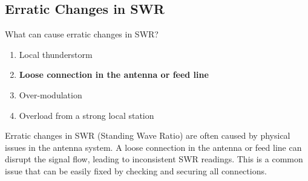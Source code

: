 \subsection{Erratic Changes in SWR}
\label{T9B09}

\begin{tcolorbox}[colback=gray!10!white,colframe=black!75!black,title=T9B09]
What can cause erratic changes in SWR?
\begin{enumerate}[noitemsep]
    \item Local thunderstorm
    \item \textbf{Loose connection in the antenna or feed line}
    \item Over-modulation
    \item Overload from a strong local station
\end{enumerate}
\end{tcolorbox}

Erratic changes in SWR (Standing Wave Ratio) are often caused by physical issues in the antenna system. A loose connection in the antenna or feed line can disrupt the signal flow, leading to inconsistent SWR readings. This is a common issue that can be easily fixed by checking and securing all connections.
